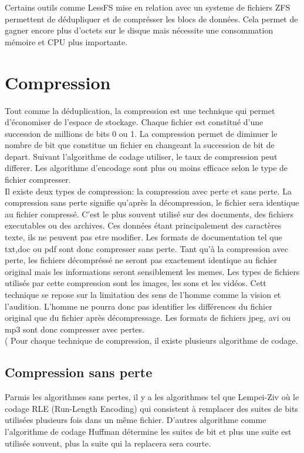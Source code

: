 \documentclass[a4paper]{report}
\begin{document}
Certains outils comme LessFS mise en relation avec un systeme de fichiers ZFS permettent de dédupliquer et de comprésser les blocs de données. Cela permet de gagner encore plus d'octets sur le disque mais nécessite une consommation mémoire et CPU plus importante.

	\chapter*{Compression}
	Tout comme la déduplication, la compression est une technique qui permet d'économiser de l'espace de stockage. Chaque fichier est constitué d'une succession de millions de bits 0 ou 1. La compression permet de diminuer le nombre de bit que constitue un fichier en changeant la succession de bit de depart. Suivant l'algorithme de codage utiliser, le taux de compression peut differer. Les algorithme d'encodage sont plus ou moins efficace selon le type de fichier compresser.\\
 Il existe deux types de compression: la compression avec perte et sans perte. La compression sans perte signifie qu'après la décompression, le fichier sera identique au fichier compressé. C'est le plus souvent utilisé sur des documents, des fichiers executables ou des archives. Ces données étant principalement des caractères texte, ils ne peuvent pas etre modifier. Les formats de documentation tel que txt,doc ou pdf sont donc compresser sans perte.  Tant qu'à la compression avec perte, les fichiers décompréssé ne seront pas exactement identique au fichier original mais les informations seront sensiblement les memes. Les types de fichiers utilisés par cette compression sont les images, les sons et les vidéos. Cett technique se repose sur la limitation des sens de l'homme comme la vision et l'audition. L'homme ne pourra donc pas identifier les différences du fichier original que du fichier après décompressage. Les formats de fichiers jpeg, avi ou mp3 sont donc compresser avec pertes. \\(
Pour chaque technique de compression, il existe plusieurs algorithme de codage.\\
	\section{Compression sans perte}
	Parmis les algorithmes sans pertes, il y a les algorithmes tel que Lempei-Ziv où le codage RLE (Run-Length Encoding) qui consistent à remplacer des suites de bits utilisées plusieurs fois dans un même fichier. D'autres algorithme comme l'algorithme de codage Huffman détermine les suites de bit et plus une suite est utilisée souvent, plus la suite qui la replacera sera courte.
\end{document}
